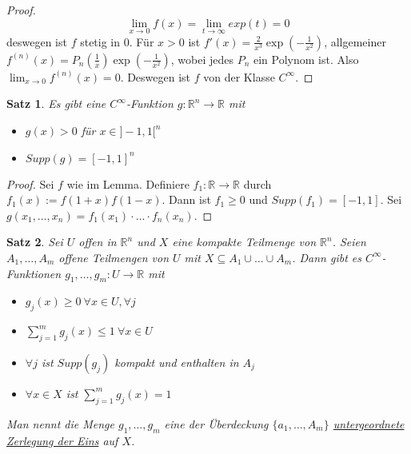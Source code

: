 \documentclass[10pt,a4paper]{report}
\newtheorem{satz}{Satz}
\begin{document}
\begin{proof}
  \begin{equation}
    \lim_{x \rightarrow 0} f(x) = \lim_{t \rightarrow \infty} exp(t) = 0
  \end{equation}
  deswegen ist $f$ stetig in $0$.
  Für $x > 0$ ist $f'(x) = \frac{2}{x^{3}}\exp(-\frac{1}{x^{2}})$, allgemeiner $f^{(n)}(x) = P_{n}(\frac{1}{x})\exp(-\frac{1}{x^{2}})$, wobei jedes $P_{n}$ ein Polynom ist.
  Also $\lim_{x \rightarrow 0} f^{(n)}(x) = 0$.
  Deswegen ist $f$ von der Klasse $C^{\infty}$.
\end{proof}

\begin{satz}
  Es gibt eine $C^{\infty}$-Funktion $g : \mathbb{R}^{n} \rightarrow \mathbb{R}$ mit
  \begin{itemize}
  \item $g(x) > 0$ für $x \in ]-1, 1[^{n}$
  \item $Supp(g) = [-1, 1]^{n}$
  \end{itemize}
\end{satz}

\begin{proof}
  Sei $f$ wie im Lemma.
  Definiere $f_{1} : \mathbb{R} \rightarrow \mathbb{R}$ durch $f_{1}(x) := f(1 + x)f(1 - x)$.
  Dann ist $f_{1} \ge 0$ und $Supp(f_{1}) = [-1, 1]$.
  Sei $g(x_{1}, \dots, x_{n}) = f_{1}(x_{1}) \cdot \dots \cdot f_{n}(x_{n})$.
\end{proof}

\begin{satz}
  Sei $U$ offen in $\mathbb{R}^{n}$ und $X$ eine kompakte Teilmenge von $\mathbb{R}^{n}$.
  Seien $A_{1}, \dots, A_{m}$ offene Teilmengen von $U$ mit $X \subseteq A_{1} \cup \dots \cup A_{m}$.
  Dann gibt es $C^{\infty}$-Funktionen $g_{1}, \dots, g_{m} : U \rightarrow \mathbb{R}$ mit
  \begin{itemize}
  \item $g_{j}(x) \ge 0\ \forall x \in U, \forall j$
  \item $\sum_{j = 1}^{m} g_{j}(x) \le 1\ \forall x \in U$
  \item $\forall j$ ist $Supp(g_{j})$ kompakt und enthalten in $A_{j}$
  \item $\forall x \in X$ ist $\sum_{j = 1}^{m} g_{j}(x) = 1$
  \end{itemize}
  Man nennt die Menge $g_{1}, \dots, g_{m}$ eine der Überdeckung $\{ a_{1}, \dots, A_{m} \}$ \underline{untergeordnete Zerlegung der Eins} auf $X$.
\end{satz}
\end{document}

